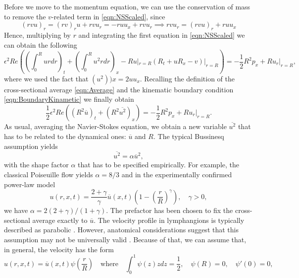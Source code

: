 \documentclass[12pt,a4paper]{article}
\begin{document}
Before we move to the momentum equation, we can use the conservation of mass to remove the $v$-related term in \eqref{eqn:NSScaled}, since
\begin{equation}
	(r v u)_r = (rv)_r u + r v u_r = - r u u_x + r v u_r \implies r v u_r = (r v u)_r + r u u_x
\end{equation}
Hence, multiplying by $r$ and integrating the first equation in \eqref{eqn:NSScaled} we can obtain the following
\begin{equation}
	\epsilon^2 Re\left(\left(\int_0^R u r dr\right)_t + \left(\int_0^R u^2 r dr\right)_x - R u|_{r = R}\left(R_t + u R_x - v\right)|_{r=R}\right) = - \frac{1}{2}R^2 p_x + R u_r|_{r=R},
\end{equation}
where we used the fact that $(u^2))x = 2 u u_x$. Recalling the definition of the cross-sectional average \eqref{eqn:Average} and the kinematic boundary condition \eqref{eqn:BoundaryKinametic} we finally obtain
\begin{equation}\label{eqn:NSAveraged0}
	\frac{1}{2}\epsilon^2 Re \left(\left(R^2 \overline{u}\right)_t + \left(R^2 \overline{u^2}\right)_x\right) = - \frac{1}{2}R^2 p_x + R u_r|_{r=R}.
\end{equation}
As usual, averaging the Navier-Stokes equation, we obtain a new variable $ \overline{u^2}$ that has to be related to the dynamical ones: $\overline{u}$ and $R$. The typical Bussinesq assumption yields
\begin{equation}
	\overline{u^2} = \alpha \overline{u}^2,
\end{equation}
with the shape factor $\alpha$ that has to be specified empirically. For example, the classical Poiseuille flow yields $\alpha = 8/3$ and in the experimentally confirmed power-law model \cite{smith2002anatomically}
\begin{equation}\label{eqn:PowerLawVelocity}
	u(r,x,t) = \frac{2+\gamma}{\gamma}\overline{u}(x,t) \left(1-\left(\frac{r}{R}\right)^\gamma\right), \quad \gamma > 0,
\end{equation} 
we have $\alpha = 2(2+\gamma)/(1+\gamma)$. The prefactor has been chosen to fix the cross-sectional average exactly to $\overline{u}$. The velocity profile in lymphangions is typically described as parabolic \cite{rahbar2011model, contarino2018one}. However, anatomical considerations suggest that this assumption may not be universally valid \cite{margaris2012modelling}. Because of that, we can assume that, in general, the velocity has the form
\begin{equation}\label{eqn:VelocityProfile}
	u(r,x,t) = \overline{u}(x,t) \psi\left(\frac{r}{R}\right) \quad \text{where} \quad \int_0^1 \psi(z) z dz = \frac{1}{2}, \quad \psi(R) = 0, \quad \psi'(0) = 0,
\end{equation}
\end{document}
